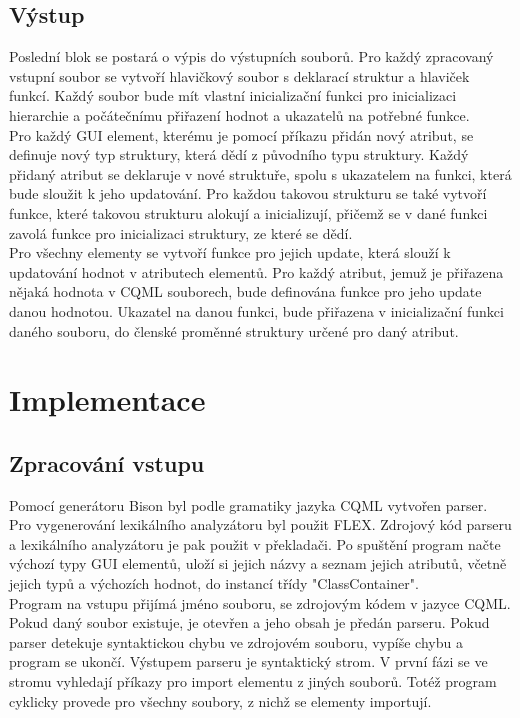 \documentclass[report,11pt]{elsarticle}
\begin{document}
\subsection{Výstup}
Poslední blok se postará o výpis do výstupních souborů. Pro každý zpracovaný vstupní soubor se vytvoří hlavičkový soubor s deklarací struktur a hlaviček funkcí. Každý soubor bude mít vlastní inicializační funkci pro inicializaci hierarchie a počátečnímu přiřazení hodnot a ukazatelů na potřebné funkce.\\
Pro každý GUI element, kterému je pomocí příkazu přidán nový atribut, se definuje nový typ struktury, která dědí z původního typu struktury. Každý přidaný atribut se deklaruje v nové struktuře, spolu s ukazatelem na funkci, která bude sloužit k jeho updatování. Pro každou takovou strukturu se také vytvoří funkce, které takovou strukturu alokují a inicializují, přičemž se v dané funkci zavolá funkce pro inicializaci struktury, ze které se dědí.\\
Pro všechny elementy se vytvoří funkce pro jejich update, která slouží k updatování hodnot v atributech elementů. Pro každý atribut, jemuž je přiřazena nějaká hodnota v CQML souborech, bude definována funkce pro jeho update danou hodnotou. Ukazatel na danou funkci, bude přiřazena v inicializační funkci daného souboru, do členské proměnné struktury určené pro daný atribut.\\



\section{\label{SEC:Intro}Implementace}

\subsection{Zpracování vstupu}
Pomocí generátoru Bison byl podle gramatiky jazyka CQML vytvořen parser. Pro vygenerování lexikálního analyzátoru byl použit FLEX. Zdrojový kód parseru a lexikálního analyzátoru je pak použit v překladači.
Po spuštění program načte výchozí typy GUI elementů, uloží si jejich názvy a seznam jejich atributů, včetně jejich typů a výchozích hodnot, do instancí třídy "ClassContainer".\\
Program na vstupu přijímá jméno souboru, se zdrojovým kódem v jazyce CQML. Pokud daný soubor existuje, je otevřen a jeho obsah je předán parseru. Pokud parser detekuje syntaktickou chybu ve zdrojovém souboru, vypíše chybu a program se ukončí. Výstupem parseru je syntaktický strom. V první fázi se ve stromu vyhledají příkazy pro import elementu z jiných souborů. Totéž program cyklicky provede pro všechny soubory, z nichž se elementy importují.
\end{document}
